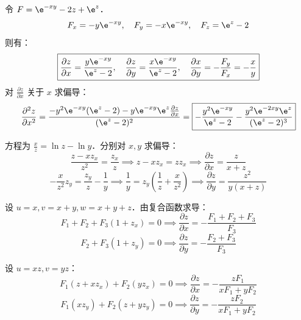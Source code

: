 \begin{solution}
    令 $F = \e^{-xy} - 2z + \e^z$．
    \begin{equation}
        F_x = -y \e^{-xy}, \quad F_y = -x \e^{-xy}, \quad F_z = \e^z - 2
    \end{equation}
    则有：
    \begin{equation}
        \boxed{\frac{\partial z}{\partial x} = \frac{y \e^{-xy}}{\e^z - 2}, \quad \frac{\partial z}{\partial y} = \frac{x \e^{-xy}}{\e^z - 2}, \quad \frac{\partial x}{\partial y} = -\frac{F_y}{F_x} = -\frac{x}{y}}
    \end{equation}
    对 $\frac{\partial z}{\partial x}$ 关于 $x$ 求偏导：
    \begin{equation}
        \frac{\partial^2 z}{\partial x^2} = \frac{-y^2 \e^{-xy}(\e^z - 2) - y \e^{-xy} \e^z \frac{\partial z}{\partial x}}{(\e^z - 2)^2} = \boxed{-\frac{y^2 \e^{-xy}}{\e^z - 2} - \frac{y^2 \e^{-2xy} \e^z}{(\e^z - 2)^3}}
    \end{equation}

    方程为 $\frac{x}{z} = \ln z - \ln y$．分别对 $x, y$ 求偏导：
    \begin{equation}
        \frac{z - x z_x}{z^2} = \frac{z_x}{z} \implies z - x z_x = z z_x \implies \boxed{\frac{\partial z}{\partial x} = \frac{z}{x + z}}
    \end{equation}
    \begin{equation}
        -\frac{x}{z^2} z_y = \frac{z_y}{z} - \frac{1}{y} \implies \frac{1}{y} = z_y \left(\frac{1}{z} + \frac{x}{z^2}\right) \implies \boxed{\frac{\partial z}{\partial y} = \frac{z^2}{y(x + z)}}
    \end{equation}

    设 $u=x, v=x+y, w=x+y+z$．由复合函数求导：
    \begin{equation}
        F_1 + F_2 + F_3 (1 + z_x) = 0 \implies \boxed{\frac{\partial z}{\partial x} = -\frac{F_1 + F_2 + F_3}{F_3}}
    \end{equation}
    \begin{equation}
        F_2 + F_3 (1 + z_y) = 0 \implies \boxed{\frac{\partial z}{\partial y} = -\frac{F_2 + F_3}{F_3}}
    \end{equation}

    设 $u=xz, v=yz$：
    \begin{equation}
        F_1 (z + x z_x) + F_2 (y z_x) = 0 \implies \boxed{\frac{\partial z}{\partial x} = -\frac{z F_1}{x F_1 + y F_2}}
    \end{equation}
    \begin{equation}
        F_1 (x z_y) + F_2 (z + y z_y) = 0 \implies \boxed{\frac{\partial z}{\partial y} = -\frac{z F_2}{x F_1 + y F_2}}
    \end{equation}
\end{solution}

